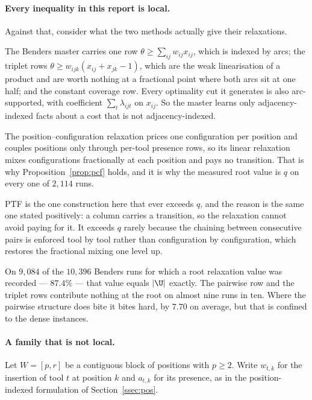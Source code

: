 \paragraph{Every inequality in this report is local.}
Against that, consider what the two methods actually give their relaxations.

The Benders master carries one row $\theta\ge\sum_{ij}w_{ij}x_{ij}$, which is indexed
by arcs; the triplet rows $\theta\ge w_{ijk}(x_{ij}+x_{jk}-1)$, which are the weak
linearisation of a product and are worth nothing at a fractional point where both arcs
sit at one half; and the constant coverage row. Every optimality cut it generates is
also arc-supported, with coefficient $\sum_t\lambda_{ijt}$ on $x_{ij}$. So the master
learns only adjacency-indexed facts about a cost that is not adjacency-indexed.

The position--configuration relaxation prices one configuration per position and
couples positions only through per-tool presence rows, so its linear relaxation mixes
configurations fractionally at each position and pays no transition. That is why
Proposition~\ref{prop:pcf} holds, and it is why the measured root value is $q$ on every
one of $2{,}114$ runs.

PTF is the one construction here that ever exceeds $q$, and the reason is the same one
stated positively: a column carries a transition, so the relaxation cannot avoid paying
for it. It exceeds $q$ rarely because the chaining between consecutive pairs is enforced
tool by tool rather than configuration by configuration, which restores the fractional
mixing one level up.

\begin{observation}\label{obs:rootq}
On $9{,}084$ of the $10{,}396$ Benders runs for which a root relaxation value was
recorded --- $87.4\%$ --- that value equals $\lvert\U\rvert$ exactly. The pairwise row
and the triplet rows contribute nothing at the root on almost nine runs in ten. Where
the pairwise structure does bite it bites hard, by $7.70$ on average, but that is
confined to the dense instances.
\end{observation}

\paragraph{A family that is not local.}
Let $W=[p,r]$ be a contiguous block of positions with $p\ge2$. Write $w_{t,k}$ for the
insertion of tool $t$ at position $k$ and $a_{t,k}$ for its presence, as in the
position-indexed formulation of Section~\ref{ssec:pos}.

